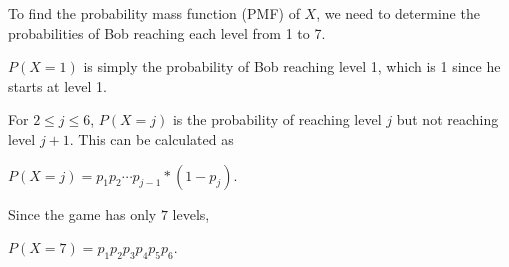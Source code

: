 To find the probability mass function (PMF) of $X$, we need to determine the probabilities of Bob reaching each level from 1 to 7.

$P(X = 1)$ is simply the probability of Bob reaching level 1, which is 1 since he starts at level 1.

For $2 \leq j \leq 6$, $P(X = j)$ is the probability of reaching level $j$ but not reaching level $j+1$. 
This can be calculated as 

$P(X = j) = p_1 p_2 \cdots p_{j-1} * (1 - p_j)$.

Since the game has only $7$ levels,

$P(X = 7) = p_1  p_2 p_3  p_4  p_5  p_6$.
